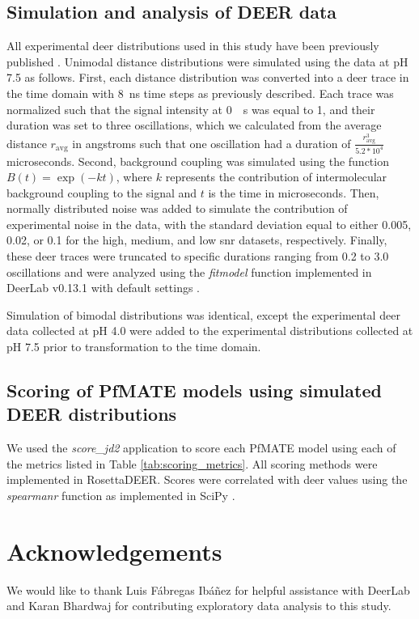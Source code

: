 \subsection{Simulation and analysis of DEER data}

All experimental \gls{deer} distributions used in this study have been previously published \citep*{Jagessar2020}. Unimodal distance distributions were simulated using the data at pH 7.5 as follows. First, each distance distribution was converted into a \gls{deer} trace in the time domain with \SI{8}{ns} time steps as previously described. Each trace was normalized such that the signal intensity at \SI{0}{\upmu s} was equal to 1, and their duration was set to three oscillations, which we calculated from the average distance $r_{\mathup{avg}}$ in angstroms such that one oscillation had a duration of $ \frac{r_{\mathup{avg}}^3}{5.2*10^4} $ microseconds. Second, background coupling was simulated using the function $B \left(t \right)=\exp \left( -kt \right)$, where $k$ represents the contribution of intermolecular background coupling to the signal and $t$ is the time in microseconds. Then, normally distributed noise was added to simulate the contribution of experimental noise in the data, with the standard deviation equal to either 0.005, 0.02, or 0.1 for the high, medium, and low \gls{snr} datasets, respectively. Finally, these \gls{deer} traces were truncated to specific durations ranging from 0.2 to 3.0 oscillations and were analyzed using the \emph{fitmodel} function implemented in DeerLab v0.13.1 with default settings \citep*{FabregasIbanez2020a}.

Simulation of bimodal distributions was identical, except the experimental \gls{deer} data collected at pH 4.0 were added to the experimental distributions collected at pH 7.5 prior to transformation to the time domain.

\subsection{Scoring of PfMATE models using simulated DEER distributions}

We used the \emph{score\_jd2} application to score each PfMATE model using each of the metrics listed in Table \ref{tab:scoring_metrics}. All scoring methods were implemented in RosettaDEER. Scores were correlated with \gls{deer} values using the \emph{spearmanr} function as implemented in SciPy \citep*{Virtanen2020}.

\section{Acknowledgements}

We would like to thank Luis Fábregas Ibáñez for helpful assistance with DeerLab and Karan Bhardwaj for contributing exploratory data analysis to this study.